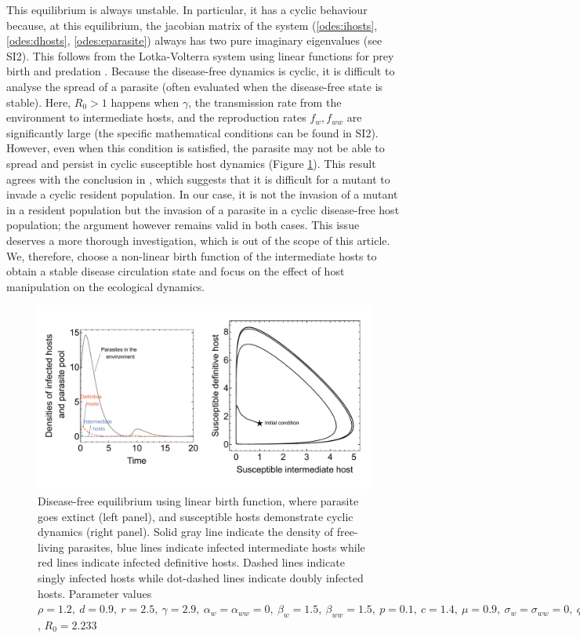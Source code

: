 \documentclass[11pt]{article}
\begin{document}
This equilibrium is always unstable. 
In particular, it has a cyclic behaviour because, at this equilibrium, the jacobian matrix of the system (\ref{odes:ihosts}, \ref{odes:dhosts}, \ref{odes:eparasite}) always has two pure imaginary eigenvalues (see SI2). 
This follows from the Lotka-Volterra system using linear functions for prey birth and predation \citep{Lotka1920}.
Because the disease-free dynamics is cyclic, it is difficult to analyse the spread of a parasite (often evaluated when the disease-free state is stable). 
Here,  $R_0 > 1$  happens when $\gamma$, the transmission rate from the environment to intermediate hosts, and the reproduction rates $f_w, f_{ww}$ are significantly large (the specific mathematical conditions can be found in SI2). 
However, even when this condition is satisfied, the parasite may not be able to spread and persist in cyclic susceptible host dynamics (Figure \ref{fig:diseasefree:linear}). 
This result agrees with the conclusion in \citep{Ripa:Evol:2013}, which suggests that it is difficult for a mutant to invade a cyclic resident population. 
In our case, it is not the invasion of a mutant in a resident population but the invasion of a parasite in a cyclic disease-free host population; the argument however remains valid in both cases. 
This issue deserves a more thorough investigation, which is out of the scope of this article. 
We, therefore, choose a non-linear birth function of the intermediate hosts to obtain a stable disease circulation state and focus on the effect of host manipulation on the ecological dynamics. 

\begin{figure}[!ht]
\includegraphics[width=\textwidth]{Figures/diseasefree_linear.pdf}
\caption{Disease-free equilibrium using linear birth function, where parasite goes extinct (left panel), and susceptible hosts demonstrate cyclic dynamics (right panel). Solid gray line indicate the density of free-living parasites, blue lines indicate infected intermediate hosts while red lines indicate infected definitive hosts. Dashed lines indicate singly infected hosts while dot-dashed lines indicate doubly infected hosts. Parameter values  $\rho = 1.2, \  d = 0.9, \  r = 2.5, \ \gamma = 2.9, \ \alpha_w =  \alpha_{ww} =  0, \ \beta_w  = 1.5, \ \beta_{ww} = 1.5, \ p = 0.1,  \ c = 1.4, \ \mu = 0.9,  \ \sigma_w = \sigma_{ww} = 0, \ q = 0.01, \  f_w = 6.5, \  f_{ww} = 7.5, \ \delta = 0.9$, $R_0 = 2.233$ } 
\label{fig:diseasefree:linear}
\end{figure}
\end{document}
